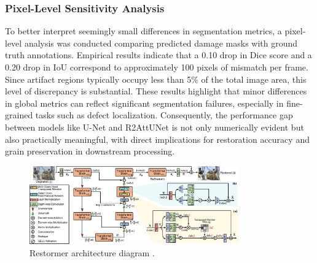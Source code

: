 \documentclass[10pt,a4paper,twocolumn,twoside]{article}
\begin{document}
\subsubsection{Pixel-Level Sensitivity Analysis}
To better interpret seemingly small differences in segmentation metrics, a pixel-level analysis was conducted comparing predicted damage masks with ground truth annotations. Empirical results indicate that a 0.10 drop in Dice score and a 0.20 drop in IoU correspond to approximately 100 pixels of mismatch per frame. Since artifact regions typically occupy less than 5\% of the total image area, this level of discrepancy is substantial. These results highlight that minor differences in global metrics can reflect significant segmentation failures, especially in fine-grained tasks such as defect localization. Consequently, the performance gap between models like U-Net and R2AttUNet is not only numerically evident but also practically meaningful, with direct implications for restoration accuracy and grain preservation in downstream processing.
\begin{figure}[t]
    \centering
    \includegraphics[width= 0.8\textwidth]{img/architecture.pdf}\vspace{-0.6em}
    \caption{Restormer architecture diagram \cite{restormer}. }
    \label{fig:framework}
    \vspace{-1em}
\end{figure}
\end{document}
